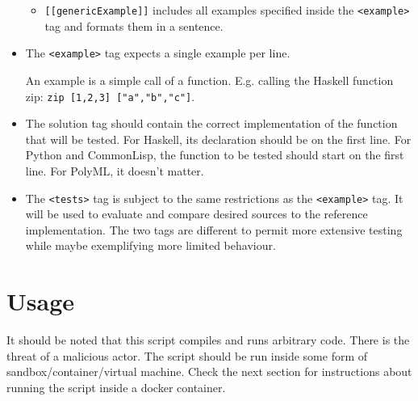 \documentclass[a4paper,12pt]{article}
\begin{document}
\begin{itemize}
\begin{itemize}
  \item \texttt{[[genericExample]]} includes all examples specified inside the \texttt{<example>} tag and formats them in a sentence.
    
 \end{itemize}
 
 \item The \texttt{<example>} tag expects a single example per line.
 
 An example is a simple call of a function. E.g. calling the Haskell function zip: \texttt{zip [1,2,3] ["a","b","c"]}.
 
 \item The solution tag should contain the correct implementation of the function that will be tested. For Haskell, its declaration should be on the first line. For Python and CommonLisp, the function to be tested should start on the first line. For PolyML, it doesn't matter.

 \item The \texttt{<tests>} tag is subject to the same restrictions as the \texttt{<example>} tag. It will be used to evaluate and compare desired sources to the reference implementation. The two tags are different to permit more extensive testing while maybe exemplifying more limited behaviour.
 
\end{itemize}

\section{Usage}

It should be noted that this script compiles and runs arbitrary code. There is the threat of a malicious actor. The script should be run inside some form of sandbox/container/virtual machine. Check the next section for instructions about running the script inside a docker container.
\end{document}
